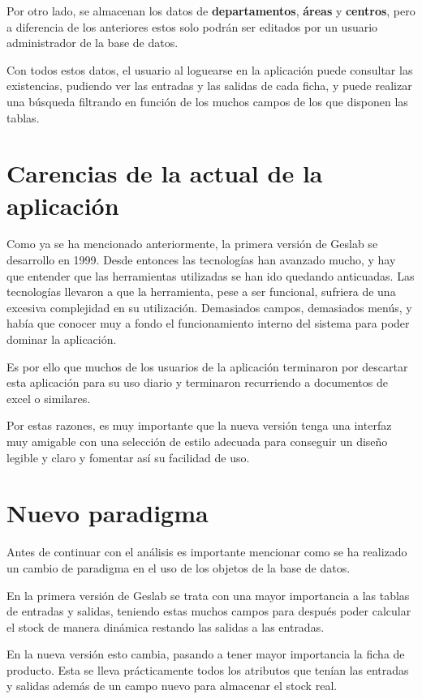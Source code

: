Por otro lado, se almacenan los datos de \textbf{departamentos}, \textbf{áreas} y \textbf{centros}, pero a diferencia de los anteriores estos solo podrán ser editados por un usuario administrador de la base de datos.

Con todos estos datos, el usuario al loguearse en la aplicación puede consultar las existencias, pudiendo ver las entradas y las salidas de cada ficha, y puede realizar una búsqueda filtrando en función de los muchos campos de los que disponen las tablas.


\section{Carencias de la actual de la aplicación}

Como ya se ha mencionado anteriormente, la primera versión de Geslab se desarrollo en 1999. Desde entonces las tecnologías han avanzado mucho, y hay que entender que las herramientas utilizadas se han ido quedando anticuadas. Las tecnologías llevaron a que la herramienta, pese a ser funcional, sufriera de una excesiva complejidad en su utilización. Demasiados campos, demasiados menús, y había que conocer muy a fondo el funcionamiento interno del sistema para poder dominar la aplicación.

Es por ello que muchos de los usuarios de la aplicación terminaron por descartar esta aplicación para su uso diario y terminaron recurriendo a documentos de excel o similares.

Por estas razones, es muy importante que la nueva versión tenga una interfaz muy amigable con una selección de estilo adecuada para conseguir un diseño legible y claro y fomentar así su facilidad de uso.


\section{Nuevo paradigma}

Antes de continuar con el análisis es importante mencionar como se ha realizado un cambio de paradigma en el uso de los objetos de la base de datos.

En la primera versión de Geslab se trata con una mayor importancia a las tablas de entradas y salidas, teniendo estas muchos campos para después poder calcular el stock de manera dinámica restando las salidas a las entradas. 

En la nueva versión esto cambia, pasando a tener mayor importancia la ficha de producto. Esta se lleva prácticamente todos los atributos que tenían las entradas y salidas además de un campo nuevo para almacenar el stock real.

